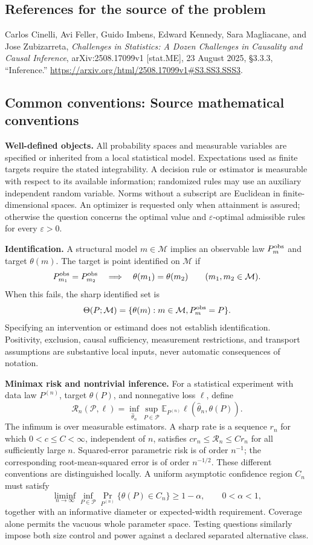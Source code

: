 \documentclass[11pt,a4paper]{article}
\newcommand{\E}{\mathbb E}
\begin{document}
\subsection*{References for the source of the problem}
Carlos Cinelli, Avi Feller, Guido Imbens, Edward Kennedy, Sara Magliacane, and Jose Zubizarreta, \emph{Challenges in Statistics: A Dozen Challenges in Causality and Causal Inference}, arXiv:2508.17099v1 [stat.ME], 23 August 2025, \S3.3.3, ``Inference.'' \url{https://arxiv.org/html/2508.17099v1#S3.SS3.SSS3}.

\subsection*{Common conventions: Source mathematical conventions}

\textbf{Well-defined objects.}
All probability spaces and measurable variables are specified or inherited
from a local statistical model. Expectations used as finite targets require
the stated integrability. A decision rule or estimator is measurable with
respect to its available information; randomized rules may use an auxiliary
independent random variable. Norms without a subscript are Euclidean in
finite-dimensional spaces. An optimizer is requested only when attainment
is assured; otherwise the question concerns the optimal value and
$\varepsilon$-optimal admissible rules for every $\varepsilon>0$.

\textbf{Identification.}
A structural model $m\in\mathcal M$ implies an observable law
$P_m^{\rm obs}$ and target $\theta(m)$. The target is point identified on
$\mathcal M$ if
\[
 P_{m_1}^{\rm obs}=P_{m_2}^{\rm obs}
 \quad\Longrightarrow\quad\theta(m_1)=\theta(m_2)
 \qquad(m_1,m_2\in\mathcal M).
\]
When this fails, the sharp identified set is
\[
 \Theta(P;\mathcal M)=\{\theta(m):m\in\mathcal M,
                                  P_m^{\rm obs}=P\}.
\]
Specifying an intervention or estimand does not establish identification.
Positivity, exclusion, causal sufficiency, measurement restrictions, and
transport assumptions are substantive local inputs, never automatic
consequences of notation.

\textbf{Minimax risk and nontrivial inference.}
For a statistical experiment with data law $P^{(n)}$, target $\theta(P)$,
and nonnegative loss $\ell$, define
\[
 \mathcal R_n(\mathcal P,\ell)
   =\inf_{\widehat\theta_n}\sup_{P\in\mathcal P}
      \E_{P^{(n)}}\ell(\widehat\theta_n,\theta(P)).
\]
The infimum is over measurable estimators. A sharp rate is a sequence
$r_n$ for which $0<c\leq C<\infty$, independent of $n$, satisfies
$c r_n\leq\mathcal R_n\leq C r_n$ for all sufficiently large $n$.
Squared-error parametric risk is of order $n^{-1}$; the corresponding
root-mean-squared error is of order $n^{-1/2}$. These different conventions
are distinguished locally. A uniform asymptotic confidence region $C_n$
must satisfy
\[
 \liminf_{n\to\infty}\inf_{P\in\mathcal P}
     \Pr_{P^{(n)}}\{\theta(P)\in C_n\}\geq 1-\alpha,
 \qquad 0<\alpha<1,
\]
together with an informative diameter or expected-width requirement.
Coverage alone permits the vacuous whole parameter space. Testing questions
similarly impose both size control and power against a declared separated
alternative class.
\end{document}
